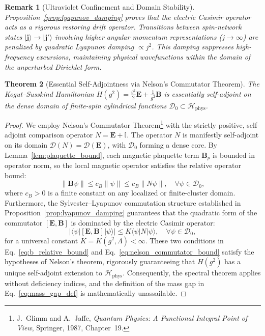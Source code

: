 \documentclass[11pt,reqno]{article}
\newtheorem{theorem}{Theorem}[section]
\newtheorem{remark}[theorem]{Remark}
\begin{document}
\begin{remark}[Ultraviolet Confinement and Domain Stability]
\label{rem:uv_confinement_lyapunov}
Proposition~\ref{prop:lyapunov_damping} proves that the electric Casimir operator acts as a rigorous restoring drift operator. Transitions between spin-network states $|\mathbf{j}\rangle \to |\mathbf{j}'\rangle$ involving higher angular momentum representations ($j \to \infty$) are penalized by quadratic Lyapunov damping $\propto j^2$. This damping suppresses high-frequency excursions, maintaining physical wavefunctions within the domain of the unperturbed Dirichlet form.
\end{remark}

\begin{theorem}[Essential Self-Adjointness via Nelson's Commutator Theorem]
\label{thm:essential_self_adjointness}
The Kogut--Susskind Hamiltonian $H(g^2) = \frac{g^2}{2}\mathbf{E} + \frac{1}{g^2}\mathbf{B}$ is essentially self-adjoint on the dense domain of finite-spin cylindrical functions $\mathcal{D}_0 \subset \mathcal{H}_{\mathrm{phys}}$.
\end{theorem}
\begin{proof}
We employ Nelson's Commutator Theorem\footnote{J.~Glimm and A.~Jaffe, \emph{Quantum Physics: A Functional Integral Point of View}, Springer, 1987, Chapter~19.} with the strictly positive, self-adjoint comparison operator $N = \mathbf{E} + \mathbb{I}$. The operator $N$ is manifestly self-adjoint on its domain $\mathcal{D}(N) = \mathcal{D}(\mathbf{E})$, with $\mathcal{D}_0$ forming a dense core.
By Lemma~\ref{lem:plaquette_bound}, each magnetic plaquette term $\mathbf{B}_p$ is bounded in operator norm, so the local magnetic operator satisfies the relative operator bound:
\begin{equation}
    \label{eq:b_relative_bound}
    \| \mathbf{B} \psi \| \le c_B \| \psi \| \le c_B \| N \psi \|, \quad \forall \psi \in \mathcal{D}_0,
\end{equation}
where $c_B > 0$ is a finite constant on any localized or finite-cluster domain.
Furthermore, the Sylvester--Lyapunov commutation structure established in Proposition~\ref{prop:lyapunov_damping} guarantees that the quadratic form of the commutator $[\mathbf{E}, \mathbf{B}]$ is dominated by the electric Casimir operator:
\begin{equation}
    \label{eq:nelson_commutator_bound}
    | \langle \psi | [\mathbf{E}, \mathbf{B}] | \psi \rangle | \le K \langle \psi | N | \psi \rangle, \quad \forall \psi \in \mathcal{D}_0,
\end{equation}
for a universal constant $K = K(g^2, \Lambda) < \infty$.
These two conditions in Eq.~\eqref{eq:b_relative_bound} and Eq.~\eqref{eq:nelson_commutator_bound} satisfy the hypotheses of Nelson's theorem, rigorously guaranteeing that $H(g^2)$ has a unique self-adjoint extension to $\mathcal{H}_{\mathrm{phys}}$. Consequently, the spectral theorem applies without deficiency indices, and the definition of the mass gap in Eq.~\eqref{eq:mass_gap_def} is mathematically unassailable.
\end{proof}
\end{document}
